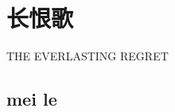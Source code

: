\documentclass{article}
\begin{document}
\tableofcontents
\newpage
\section*{长恨歌}

THE EVERLASTING REGRET

\subsection{mei le}
\end{document}
